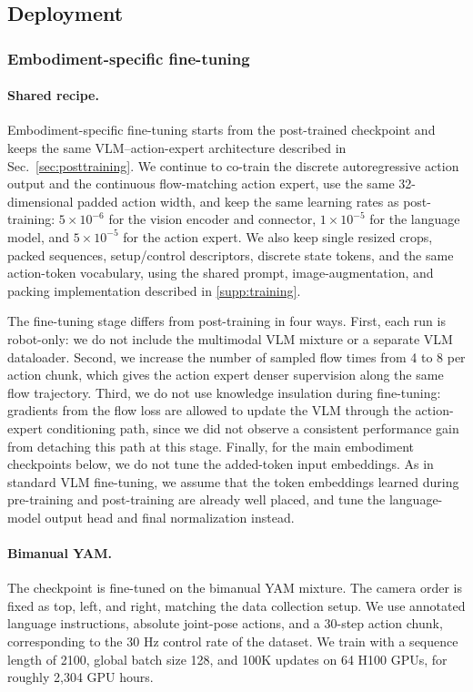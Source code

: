 
\subsection{Deployment}
\label{sec:deployment}

\subsubsection{Embodiment-specific fine-tuning}
\label{sec:finetuning}



\paragraph{Shared recipe.}
Embodiment-specific fine-tuning starts from the post-trained \molmoacttpos checkpoint and keeps the same VLM--action-expert architecture described in Sec.~\ref{sec:posttraining}. We continue to co-train the discrete autoregressive action output and the continuous flow-matching action expert, use the same 32-dimensional padded action width, and keep the same learning rates as post-training: \(5\times10^{-6}\) for the vision encoder and connector, \(1\times10^{-5}\) for the language model, and \(5\times10^{-5}\) for the action expert. We also keep single resized crops, packed sequences, setup/control descriptors, discrete state tokens, and the same action-token vocabulary, using the shared prompt, image-augmentation, and packing implementation described in \autoref{supp:training}.

The fine-tuning stage differs from post-training in four ways. First, each run is robot-only: we do not include the multimodal VLM mixture or a separate VLM dataloader. Second, we increase the number of sampled flow times from 4 to 8 per action chunk, which gives the action expert denser supervision along the same flow trajectory. Third, we do not use knowledge insulation during fine-tuning: gradients from the flow loss are allowed to update the VLM through the action-expert conditioning path, since we did not observe a consistent performance gain from detaching this path at this stage. Finally, for the main embodiment checkpoints below, we do not tune the added-token input embeddings. As in standard VLM fine-tuning, we assume that the token embeddings learned during pre-training and post-training are already well placed, and tune the language-model output head and final normalization instead.

\paragraph{Bimanual YAM.}
The \molmoacttyam checkpoint is fine-tuned on the bimanual YAM mixture. The camera order is fixed as top, left, and right, matching the data collection setup. We use annotated language instructions, absolute joint-pose actions, and a 30-step action chunk, corresponding to the 30 Hz control rate of the dataset. We train with a sequence length of 2100, global batch size 128, and 100K updates on 64 H100 GPUs, for roughly 2,304 GPU hours.

